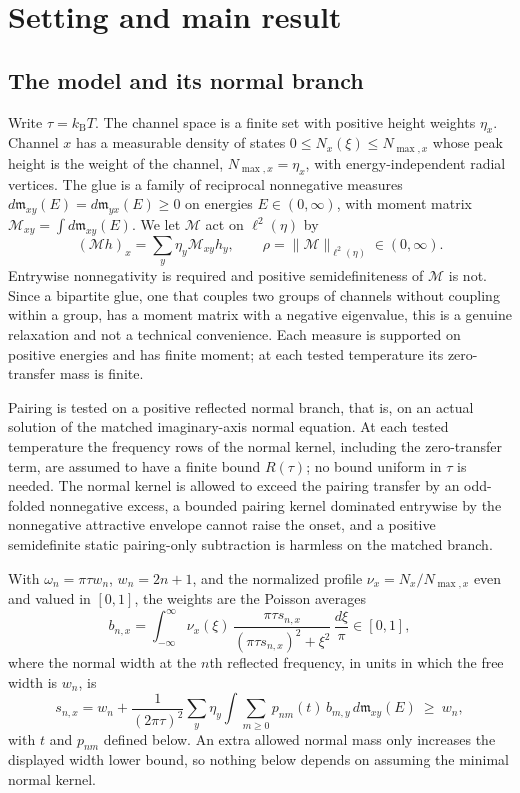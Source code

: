\documentclass[10pt]{article}
\theoremstyle{remark}
\newcommand{\kB}{k_{\mathrm B}}
\begin{document}
\section{Setting and main result}\label{sec:setting}

\subsection{The model and its normal branch}

Write $\tau=\kB T$. The channel space is a finite set with positive height weights $\eta_x$. Channel $x$ has a measurable density of states $0\le N_x(\xi)\le N_{\max,x}$ whose peak height is the weight of the channel, $N_{\max,x}=\eta_x$, with energy-independent radial vertices. The glue is a family of reciprocal nonnegative measures $d\mathfrak m_{xy}(E)=d\mathfrak m_{yx}(E)\ge0$ on energies $E\in(0,\infty)$, with moment matrix $\mathcal M_{xy}=\int d\mathfrak m_{xy}(E)$. We let $\mathcal M$ act on $\ell^2(\eta)$ by
\[
(\mathcal M h)_x=\sum_y\eta_y\mathcal M_{xy}h_y,\qquad \rho=\|\mathcal M\|_{\ell^2(\eta)}\in(0,\infty).
\]
Entrywise nonnegativity is required and positive semidefiniteness of $\mathcal M$ is not. Since a bipartite glue, one that couples two groups of channels without coupling within a group, has a moment matrix with a negative eigenvalue, this is a genuine relaxation and not a technical convenience. Each measure is supported on positive energies and has finite moment; at each tested temperature its zero-transfer mass is finite.

Pairing is tested on a positive reflected normal branch, that is, on an actual solution of the matched imaginary-axis normal equation. At each tested temperature the frequency rows of the normal kernel, including the zero-transfer term, are assumed to have a finite bound $R(\tau)$; no bound uniform in $\tau$ is needed. The normal kernel is allowed to exceed the pairing transfer by an odd-folded nonnegative excess, a bounded pairing kernel dominated entrywise by the nonnegative attractive envelope cannot raise the onset, and a positive semidefinite static pairing-only subtraction is harmless on the matched branch.

With $\omega_n=\pi\tau w_n$, $w_n=2n+1$, and the normalized profile $\nu_x=N_x/N_{\max,x}$ even and valued in $[0,1]$, the weights are the Poisson averages
\begin{equation}\label{eq:weights}
b_{n,x}=\int_{-\infty}^{\infty}\nu_x(\xi)\,\frac{\pi\tau s_{n,x}}{(\pi\tau s_{n,x})^2+\xi^2}\,\frac{d\xi}{\pi}\in[0,1],
\end{equation}
where the normal width at the $n$th reflected frequency, in units in which the free width is $w_n$, is
\begin{equation}\label{eq:normal}
s_{n,x}=w_n+\frac{1}{(2\pi\tau)^2}\sum_y\eta_y\int\sum_{m\ge0}p_{nm}(t)\,b_{m,y}\,d\mathfrak m_{xy}(E)\ \ge\ w_n ,
\end{equation}
with $t$ and $p_{nm}$ defined below. An extra allowed normal mass only increases the displayed width lower bound, so nothing below depends on assuming the minimal normal kernel.
\end{document}
